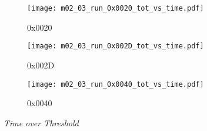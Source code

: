 \documentclass[11pt, ngerman, fleqn, DIV=15, headinclude, BCOR=2cm]{scrreprt}
\begin{document}
\begin{appendix}
	\begin{figure}
		\centering
	\begin{subfigure}[a]{0.45 \textwidth}
		\texttt{[image: m02\_03\_run\_0x0020\_tot\_vs\_time.pdf]}
		\caption{%
			0x0020
		}
		\label{fig:m02_03_run_0x0020_tot_vs_time}
	\end{subfigure}
	\begin{subfigure}[a]{0.45 \textwidth}
		\texttt{[image: m02\_03\_run\_0x002D\_tot\_vs\_time.pdf]}
		\caption{%
			0x002D
		}
		\label{fig:m02_03_run_0x002D_tot_vs_time}
	\end{subfigure}
	\begin{subfigure}[a]{0.45 \textwidth}
		\texttt{[image: m02\_03\_run\_0x0040\_tot\_vs\_time.pdf]}
		\caption{%
			0x0040
		}
		\label{fig:m02_03_run_0x0040_tot_vs_time}
	\end{subfigure}
	\caption{%
		\emph{Time over Threshold}
	}
	\label{fig:m02_03_tot_vs_time}
	\end{figure}



\end{appendix}
\end{document}
